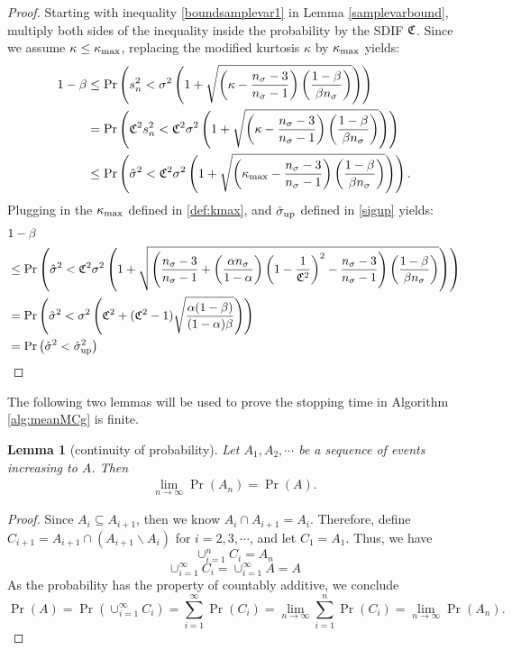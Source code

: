 \documentclass{iitthesis}
\newtheorem{lemma}[theorem]{Lemma}
\theoremstyle{definition}
\begin{document}
\begin{proof}
Starting with inequality \eqref{boundsamplevar1} in Lemma \ref{samplevarbound}, multiply both sides of the inequality inside the probability by the SDIF $\mathfrak{C}$. Since we assume $\kappa \leq \kappa_{\max}$,  replacing the modified kurtosis $\kappa$ by $\kappa_{\max}$ yields:
\begin{align*}
1-\beta &\leq \Pr\left( s_n^2 < \sigma^2 \left (1+\sqrt{\left (\kappa-\frac{n_{\sigma}-3}{n_{\sigma}-1}\right)\left (\frac{1-\beta}{\beta n_{\sigma}}\right )}\right)\right)\\&
 = \Pr\left( \mathfrak{C}^2 s_n^2 < \mathfrak{C}^2 \sigma^2 \left (1+\sqrt{\left (\kappa-\frac{n_{\sigma}-3}{n_{\sigma}-1}\right)\left (\frac{1-\beta}{\beta n_{\sigma}}\right )}\right)\right)\\&
 \leq \Pr\left( \hat{\sigma}^2 < \mathfrak{C}^2 \sigma^2 \left (1+\sqrt{\left (\kappa_{\max}-\frac{n_{\sigma}-3}{n_{\sigma}-1}\right)\left (\frac{1-\beta}{\beta n_{\sigma}}\right )}\right)\right).
 \end{align*}
Plugging in the $\kappa_{\max}$ defined in \eqref{def:kmax}, and $\hat{\sigma}_{\operatorname{up}}$ defined in \eqref{sigup} yields:
\begin{align*}
&1-\beta \\
&\leq \Pr\left( \hat{\sigma}^2 < \mathfrak{C}^2 \sigma^2 \left (1+\sqrt{\left (\frac{n_{\sigma}-3}{n_{\sigma}-1} + \left(\frac{ \alpha n_{\sigma}}{1-\alpha}\right) \left(1 - \frac{1}{\mathfrak{C}^2}\right)^2- \frac{n_{\sigma}-3}{n_{\sigma}-1}\right)\left (\frac{1-\beta}{\beta n_{\sigma}}\right )}\right)\right)\\
& = \Pr\left( \hat{\sigma}^2 < \sigma^2 \left(\mathfrak{C}^2+(\mathfrak{C}^2-1)\sqrt{\frac{\alpha(1-\beta)}{(1-\alpha)\beta}}\right)\right)\\
& =\Pr \left ( \hat{\sigma}^2< \hat{\sigma}_{\operatorname{up}}^2 \right)
\end{align*}
\end{proof}
The following two lemmas will be used to prove the stopping time in Algorithm \ref{alg:meanMCg} is finite.
\begin{lemma}[continuity of probability]\label{contiofprob}
Let $A_1, A_2, \cdots$ be a sequence of events increasing to $A$. Then
\begin{align}
\lim_{n \to \infty}\Pr(A_n) =\Pr(A).
\end{align}
\end{lemma}
\begin{proof}
Since $A_i \subseteq A_{i+1}$, then we know $A_i \cap A_{i+1} = A_i$. Therefore, define $C_{i+1} = A_{i+1} \cap (A_{i+1}\backslash A_i)$ for $i = 2,3,\cdots$, and let $C_1 = A_1$. Thus, we have
$$\cup_{i=1}^n C_i = A_n$$
$$\cup_{i=1}^\infty C_i=\cup_{i=1}^\infty A=A$$
As the probability has the property of countably additive, we conclude
$$\Pr (A) = \Pr (\cup_{i=1}^\infty C_i) = \sum_{i=1}^\infty \Pr(C_i) =  \lim_{n \to \infty}\sum_{i=1}^n\Pr(C_i)=\lim_{n\to \infty}\Pr(A_n).$$
\end{proof}
\end{document}
